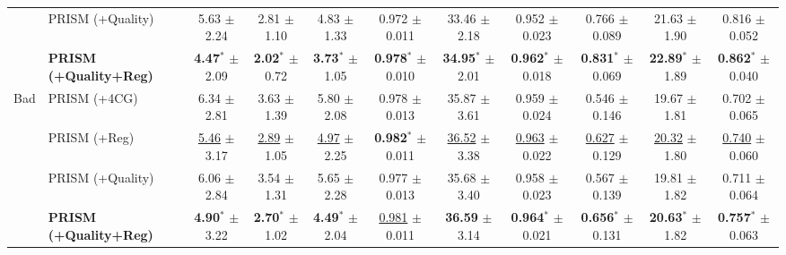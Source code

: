 \begin{tabular}{llccccccccc}
 & PRISM (+Quality) & 5.63 {\tiny$\pm$2.24} & 2.81 {\tiny$\pm$1.10} & 4.83 {\tiny$\pm$1.33} & 0.972 {\tiny$\pm$0.011} & 33.46 {\tiny$\pm$2.18} & 0.952 {\tiny$\pm$0.023} & 0.766 {\tiny$\pm$0.089} & 21.63 {\tiny$\pm$1.90} & 0.816 {\tiny$\pm$0.052} \\
 & \textbf{PRISM (+Quality+Reg)} & \textbf{4.47}$^{*}$ {\tiny$\pm$2.09} & \textbf{2.02}$^{*}$ {\tiny$\pm$0.72} & \textbf{3.73}$^{*}$ {\tiny$\pm$1.05} & \textbf{0.978}$^{*}$ {\tiny$\pm$0.010} & \textbf{34.95}$^{*}$ {\tiny$\pm$2.01} & \textbf{0.962}$^{*}$ {\tiny$\pm$0.018} & \textbf{0.831}$^{*}$ {\tiny$\pm$0.069} & \textbf{22.89}$^{*}$ {\tiny$\pm$1.89} & \textbf{0.862}$^{*}$ {\tiny$\pm$0.040} \\
\midrule
\multirow{4}{*}{Bad} & PRISM (+4CG) & 6.34 {\tiny$\pm$2.81} & 3.63 {\tiny$\pm$1.39} & 5.80 {\tiny$\pm$2.08} & 0.978 {\tiny$\pm$0.013} & 35.87 {\tiny$\pm$3.61} & 0.959 {\tiny$\pm$0.024} & 0.546 {\tiny$\pm$0.146} & 19.67 {\tiny$\pm$1.81} & 0.702 {\tiny$\pm$0.065} \\
 & PRISM (+Reg) & \underline{5.46} {\tiny$\pm$3.17} & \underline{2.89} {\tiny$\pm$1.05} & \underline{4.97} {\tiny$\pm$2.25} & \textbf{0.982}$^{*}$ {\tiny$\pm$0.011} & \underline{36.52} {\tiny$\pm$3.38} & \underline{0.963} {\tiny$\pm$0.022} & \underline{0.627} {\tiny$\pm$0.129} & \underline{20.32} {\tiny$\pm$1.80} & \underline{0.740} {\tiny$\pm$0.060} \\
 & PRISM (+Quality) & 6.06 {\tiny$\pm$2.84} & 3.54 {\tiny$\pm$1.31} & 5.65 {\tiny$\pm$2.28} & 0.977 {\tiny$\pm$0.013} & 35.68 {\tiny$\pm$3.40} & 0.958 {\tiny$\pm$0.023} & 0.567 {\tiny$\pm$0.139} & 19.81 {\tiny$\pm$1.82} & 0.711 {\tiny$\pm$0.064} \\
 & \textbf{PRISM (+Quality+Reg)} & \textbf{4.90}$^{*}$ {\tiny$\pm$3.22} & \textbf{2.70}$^{*}$ {\tiny$\pm$1.02} & \textbf{4.49}$^{*}$ {\tiny$\pm$2.04} & \underline{0.981} {\tiny$\pm$0.011} & \textbf{36.59} {\tiny$\pm$3.14} & \textbf{0.964}$^{*}$ {\tiny$\pm$0.021} & \textbf{0.656}$^{*}$ {\tiny$\pm$0.131} & \textbf{20.63}$^{*}$ {\tiny$\pm$1.82} & \textbf{0.757}$^{*}$ {\tiny$\pm$0.063} \\
\bottomrule
\end{tabular}

